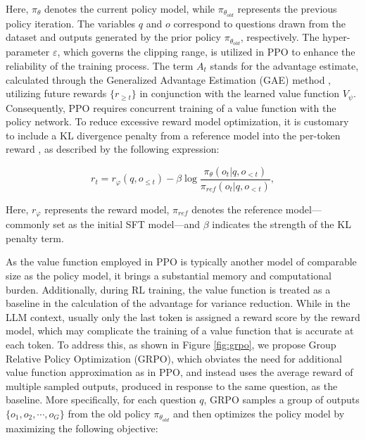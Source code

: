 \begin{itemize}[topsep=0pt]
\begin{itemize}[topsep=0pt]
Here, $\pi_{\theta}$ denotes the current policy model, while $\pi_{\theta_{old}}$ represents the previous policy iteration. The variables $q$ and $o$ correspond to questions drawn from the dataset and outputs generated by the prior policy $\pi_{\theta_{old}}$, respectively. The hyper-parameter $\varepsilon$, which governs the clipping range, is utilized in PPO to enhance the reliability of the training process. The term $A_t$ stands for the advantage estimate, calculated through the Generalized Advantage Estimation (GAE) method \citep{gae}, utilizing future rewards $\{r_{\ge t}\}$ in conjunction with the learned value function $V_{\psi}$. Consequently, PPO requires concurrent training of a value function with the policy network. To reduce excessive reward model optimization, it is customary to include a KL divergence penalty from a reference model into the per-token reward \citep{ouyang2022training}, as described by the following expression:

\begin{equation}
    r_{t} = r_\varphi(q, o_{\le t}) - \beta \log\frac{\pi_{\theta}(o_{t}|q, o_{<t})}{\pi_{ref}(o_{t}|q, o_{<t})},
\label{eq:PPO-reward}
\end{equation}

Here, $r_\varphi$ represents the reward model, $\pi_{ref}$ denotes the reference model—commonly set as the initial SFT model—and $\beta$ indicates the strength of the KL penalty term.

As the value function employed in PPO is typically another model of comparable size as the policy model, it brings a substantial memory and computational burden. Additionally, during RL training, the value function is treated as a baseline in the calculation of the advantage for variance reduction. While in the LLM context, usually only the last token is assigned a reward score by the reward model, which may complicate the training of a value function that is accurate at each token. To address this, as shown in Figure \ref{fig:grpo}, we propose Group Relative Policy Optimization (GRPO), which obviates the need for additional value function approximation as in PPO, and instead uses the average reward of multiple sampled outputs, produced in response to the same question, as the baseline. More specifically, for each question $q$, GRPO samples a group of outputs $\{o_1, o_2, \cdots, o_G\}$  from the old policy  $\pi_{\theta_{old}}$  and then optimizes the policy model by maximizing the following objective:


\end{itemize}
\end{itemize}
